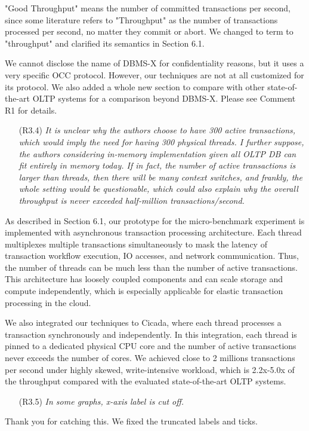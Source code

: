\documentclass{article}
\newcommand{\changed}[1]{#1}
\newcommand{\changed}[1]{{\color{blue}#1}}
\begin{document}
\changed{
	"Good Throughput" means the number of committed transactions per second, since some literature refers to "Throughput" as the number of transactions processed per second, no matter they commit or abort. We changed to term to "throughput" and clarified its semantics in Section 6.1.
	
	
	We cannot disclose the name of DBMS-X for confidentiality reasons, but it uses a very specific OCC protocol. However, our techniques are not at all customized for its protocol. 	We also added a whole new section to compare with other state-of-the-art OLTP systems for a comparison beyond DBMS-X. Please see Comment R1 for details.
	
}


\begin{itemize}
\item[(R3.4)] \emph{It is unclear why the authors choose to have 300 active transactions,
	which would imply the need for having 300 physical threads. I further
	suppose, the authors considering in-memory implementation given all OLTP
	DB can fit entirely in memory today. If in fact, the number of active
	transactions is larger than threads, then there will be many context switches,
	and frankly, the whole setting would be questionable, which could also
	explain why the overall throughput is never exceeded half-million
	transactions/second.}
\end{itemize}

\changed{
	As described in Section 6.1, our prototype for the micro-benchmark experiment is implemented with asynchronous transaction processing architecture. Each thread multiplexes multiple transactions simultaneously to mask the latency of transaction workflow execution, IO accesses, and network communication. Thus, the number of threads can be much less than the number of active transactions. This architecture has loosely coupled components and can scale storage and compute independently, which is especially applicable for elastic transaction processing in the cloud.

	We also integrated our techniques to Cicada, where each thread processes a transaction synchronously and independently. In this integration, each thread is pinned to a dedicated physical CPU core and the number of active transactions never exceeds the number of cores. We achieved close to 2 millions transactions per second under highly skewed, write-intensive workload, which is 2.2x-5.0x of the throughput compared with the evaluated state-of-the-art OLTP systems.  
}

\begin{itemize}
\item[(R3.5)] \emph{In some graphs, x-axis label is cut off.}
\end{itemize}

\changed{
	Thank you for catching this. We fixed the truncated labels and ticks.
}
\end{document}
